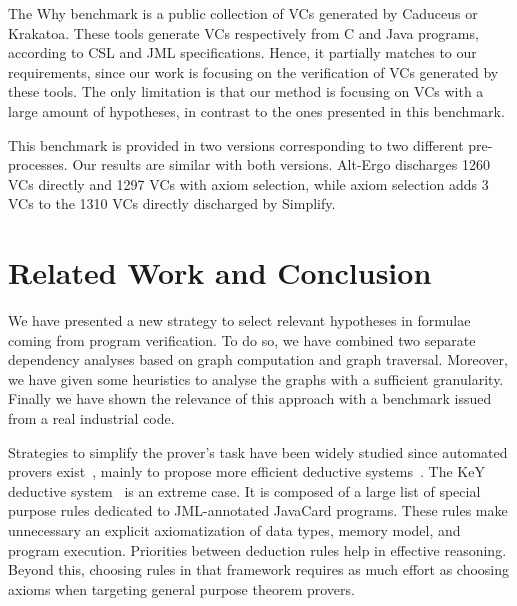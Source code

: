 \documentclass{acm_proc_article-sp}
\theoremstyle{nonumberplain}
\begin{document}
The Why benchmark is a public collection of VCs generated by Caduceus
or Krakatoa. These tools generate VCs respectively from C and Java
programs, according to CSL and JML specifications. Hence, it partially
matches to our requirements, since our work is focusing on the
verification of VCs generated by these tools. The only limitation is
that our method is focusing on VCs with a large amount of hypotheses,
in contrast to the ones presented in this benchmark.


This benchmark is provided in two versions corresponding to two
different pre-processes. Our results are similar with both versions.
Alt-Ergo discharges 1260 VCs directly and 1297 VCs with axiom
selection, while axiom selection adds 3 VCs to the 1310 VCs 
directly discharged by Simplify.


\section{Related Work and Conclusion}\label{relatedandconcl}
We have presented a new strategy 
to select relevant hypotheses in formulae coming from program 
verification. To do so, we have combined two separate dependency 
analyses based on graph computation and graph traversal. Moreover, we 
have given some heuristics to analyse the graphs with a sufficient 
granularity. Finally we have shown the relevance of this approach 
with a benchmark issued from a real industrial code.


Strategies to simplify the prover's task have been widely studied since
automated provers exist~\cite{WosRC65}, mainly to propose more
efficient deductive systems~\cite{WosRC65,WosP99,Wos01}. The KeY
deductive system~\cite{KeYBook2007} is an extreme case. It is composed
of a large list of special purpose rules dedicated to
JML-annotated JavaCard programs. These rules make unnecessary an
explicit axiomatization of  data types, memory model, and program
execution. Priorities between deduction rules help in effective 
reasoning. Beyond this, choosing rules in that framework requires
as much effort as choosing axioms when targeting general purpose
theorem provers. 
\end{document}
